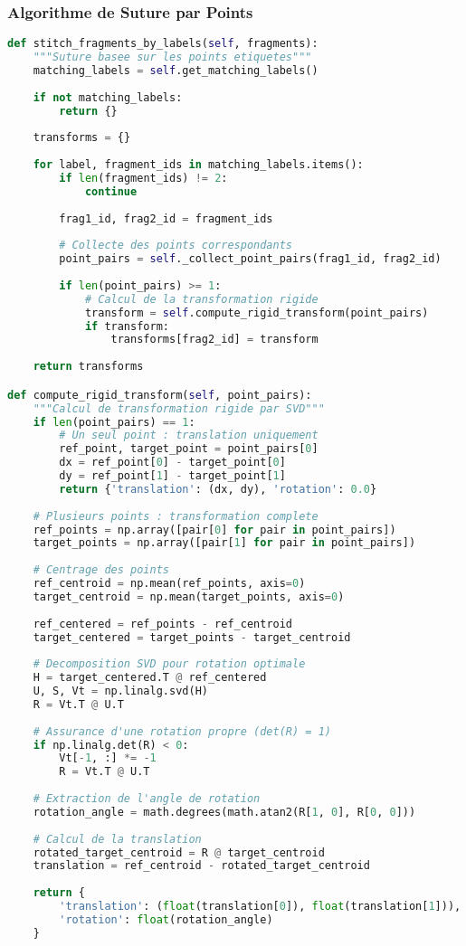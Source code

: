 \documentclass[12pt,a4paper]{article}
\begin{document}
\subsubsection{Algorithme de Suture par Points}

\begin{lstlisting}[language=Python]
def stitch_fragments_by_labels(self, fragments):
    """Suture basee sur les points etiquetes"""
    matching_labels = self.get_matching_labels()
    
    if not matching_labels:
        return {}
    
    transforms = {}
    
    for label, fragment_ids in matching_labels.items():
        if len(fragment_ids) != 2:
            continue
        
        frag1_id, frag2_id = fragment_ids
        
        # Collecte des points correspondants
        point_pairs = self._collect_point_pairs(frag1_id, frag2_id)
        
        if len(point_pairs) >= 1:
            # Calcul de la transformation rigide
            transform = self.compute_rigid_transform(point_pairs)
            if transform:
                transforms[frag2_id] = transform
    
    return transforms

def compute_rigid_transform(self, point_pairs):
    """Calcul de transformation rigide par SVD"""
    if len(point_pairs) == 1:
        # Un seul point : translation uniquement
        ref_point, target_point = point_pairs[0]
        dx = ref_point[0] - target_point[0]
        dy = ref_point[1] - target_point[1]
        return {'translation': (dx, dy), 'rotation': 0.0}
    
    # Plusieurs points : transformation complete
    ref_points = np.array([pair[0] for pair in point_pairs])
    target_points = np.array([pair[1] for pair in point_pairs])
    
    # Centrage des points
    ref_centroid = np.mean(ref_points, axis=0)
    target_centroid = np.mean(target_points, axis=0)
    
    ref_centered = ref_points - ref_centroid
    target_centered = target_points - target_centroid
    
    # Decomposition SVD pour rotation optimale
    H = target_centered.T @ ref_centered
    U, S, Vt = np.linalg.svd(H)
    R = Vt.T @ U.T
    
    # Assurance d'une rotation propre (det(R) = 1)
    if np.linalg.det(R) < 0:
        Vt[-1, :] *= -1
        R = Vt.T @ U.T
    
    # Extraction de l'angle de rotation
    rotation_angle = math.degrees(math.atan2(R[1, 0], R[0, 0]))
    
    # Calcul de la translation
    rotated_target_centroid = R @ target_centroid
    translation = ref_centroid - rotated_target_centroid
    
    return {
        'translation': (float(translation[0]), float(translation[1])),
        'rotation': float(rotation_angle)
    }
\end{lstlisting}
\end{document}
